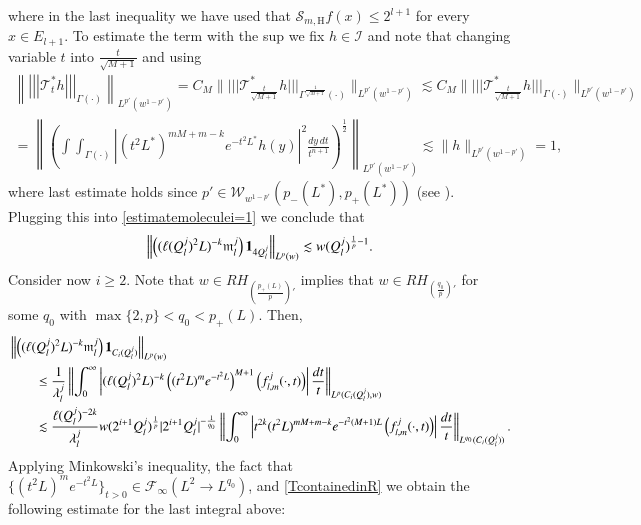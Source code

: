 \documentclass[11pt, a4paper,leqno]{amsart}
\newcommand{\mm}{\mathfrak{m}}
\renewcommand{\chi}{{\bf 1}}
\theoremstyle{plain}
\theoremstyle{definition}
\theoremstyle{remark}
\numberwithin{equation}{section}
\def \Scal{ \mathcal{S} }
\def \hh{ \mathrm{H} }
\def \iint{\int\!\!\!\int}
\begin{document}
where in the last inequality we have used that $\Scal_{m,\hh}f(x)\leq 2^{l+1}$ for every  $x\in  E_{l+1}$. To estimate the term with the sup we fix $h\in \mathcal{I}$ and note that changing variable $t$ into $\frac{t}{\sqrt{M+1}}$ and using \cite[Proposition 3.29]{MartellPrisuelos}
\begin{multline*}
\left\|\left|\!\left|\!\left|
\mathcal{T}_t^*h\right|\!\right|\!\right|_{\Gamma(\cdot)}\right\|_{L^{p'}(w^{1-p'})}
=
C_M
\bigg\|\Big|\!\Big|\!\Big|
\mathcal{T}_{\frac{t}{\sqrt{M+1}}}^*h\Big|\!\Big|\!\Big|_{\Gamma^{\frac1{\sqrt{M+1}}}(\cdot)}\bigg\|_{L^{p'}(w^{1-p'})}
\lesssim
C_M
\bigg\|\Big|\!\Big|\!\Big|
\mathcal{T}_{\frac{t}{\sqrt{M+1}}}^*h\Big|\!\Big|\!\Big|_{\Gamma(\cdot)}\bigg\|_{L^{p'}(w^{1-p'})}
\\
=
\left\|\left(\iint_{\Gamma(\cdot)}\left|(t^2L^*)^{mM+m-k}e^{-t^2L^*}h(y)\right|^2\frac{dy\,dt}{t^{n+1}}\right)^{\frac{1}{2}}\right\|_{L^{p'}(w^{1-p'})}
\lesssim
\|h\|_{L^{p'}(w^{1-p'})}=1,
\end{multline*}
where last estimate holds since $p'\in \mathcal{W}_{w^{1-p'}}(p_-(L^*),p_+(L^*))$ (see \cite{MartellPrisuelos}). Plugging this into \eqref{estimatemoleculei=1} we conclude that
\begin{align}\label{molecula1}
\left\|\left((\ell(Q_l^j)^2L)^{-k}\mm_l^j\right)\chi_{4Q_l^j}\right\|_{L^p(w)}\lesssim  w(Q_l^j)^{\frac{1}{p}-1}.
\end{align}
Consider now  $i\geq 2$. Note that $w\in RH_{\left(\frac{p_+(L)}{p}\right)'}$ implies that 
$w\in RH_{\left(\frac{q_0}{p}\right)'}$ for some $q_0$ with $\max\{2,p\}<q_0<p_+(L)$. Then,
\begin{align*}
&\left\|\left((\ell(Q_l^j)^2L)^{-k}\mm_{l}^{j}\right)\chi_{C_i(Q_l^j)}\right\|_{L^p(w)}
\\&\qquad
 \leq \frac{1}{\lambda^{j}_l} \left\|\int_{0}^{\infty}\left|(\ell(Q_l^j)^2L)^{-k}\left((t^2L)^me^{-t^2L}\right)^{M+1}
\left({f}_{l,m}^j(\cdot,t)\right)\right|
\frac{dt}{t}\right\|_{L^p(C_i(Q_l^j),w)}
\\&\qquad
\lesssim \frac{\ell(Q_l^j)^{-2k}}{\lambda^{j}_l}w(2^{i+1}Q_l^j)^{\frac{1}{p}} |2^{i+1}Q_l^j|^{-\frac{1}{q_0}}
\left\|\int_{0}^{\infty}\left|t^{2k}(t^2L)^{mM+m-k}e^{-t^2(M+1)L}
\left({f}_{l,m}^j(\cdot,t)\right)\right|
\frac{dt}{t}\right\|_{L^{q_0}(C_i(Q_l^j))}.
 \end{align*}
Applying Minkowski's inequality, the fact that $\{(t^2L)^me^{-t^2L}\}_{t>0}\in \mathcal{F}_{\infty}(L^2\rightarrow L^{q_0})$, and \eqref{TcontainedinR} we obtain the following estimate for the last integral above:
\end{document}
